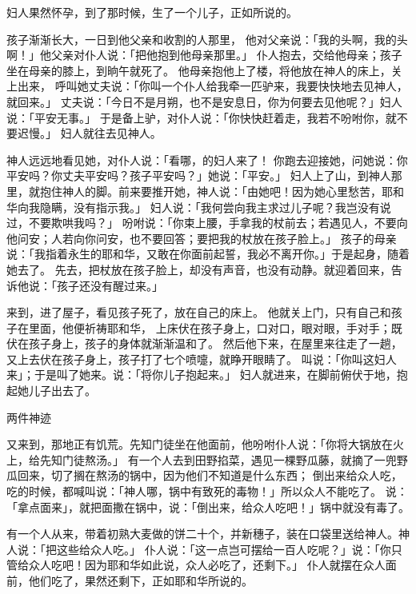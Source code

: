 {妇人果然怀孕，到了那时候，生了一个儿子，正如{}所说的。
\par }{\PP {}孩子渐渐长大，一日到他父亲和收割的人那里，
他对父亲说：「我的头啊，我的头啊！」他父亲对仆人说：「把他抱到他母亲那里。」
仆人抱去，交给他母亲；孩子坐在母亲的膝上，到晌午就死了。
他母亲抱他上了楼，将他放在神人的床上，关上{}出来，
呼叫她丈夫说：「你叫一个仆人给我牵一匹驴来，我要快快地去见神人，就回来。」
丈夫说：「今日不是月朔，也不是安息日，你为何要去见他呢？」妇人说：「平安无事。」
于是备上驴，对仆人说：「你快快赶着走，我若不吩咐你，就不要迟慢。」
妇人就往{}去见神人。
\par }{\PP 神人远远地看见她，对仆人{}说：「看哪，{}的妇人来了！
你跑去迎接她，问她说：你平安吗？你丈夫平安吗？孩子平安吗？」她说：「平安。」
妇人上了山，到神人那里，就抱住神人的脚。{}前来要推开她，神人说：「由她吧！因为她心里愁苦，耶和华向我隐瞒，没有指示我。」
妇人说：「我何尝向我主求过儿子呢？我岂没有说过，不要欺哄我吗？」
吩咐{}说：「你束上腰，手拿我的杖前去；若遇见人，不要向他问安；人若向你问安，也不要回答；要把我的杖放在孩子脸上。」
孩子的母亲说：「我指着永生的耶和华，又敢在你面前起誓，我必不离开你。」于是{}起身，随着她去了。
先去，把杖放在孩子脸上，却没有声音，也没有动静。{}就迎着{}回来，告诉他说：「孩子还没有醒过来。」
\par }{\PP {}来到，进了屋子，看见孩子死了，放在自己的床上。
他就关上门，只有自己和孩子在里面，他便祈祷耶和华，
上床伏在孩子身上，口对口，眼对眼，手对手；既伏在孩子身上，孩子的身体就渐渐温和了。
然后他下来，在屋里来往走了一趟，又上去伏在孩子身上，孩子打了七个喷嚏，就睁开眼睛了。
叫{}说：「你叫这{}妇人来」；于是叫了她来。{}说：「将你儿子抱起来。」
妇人就进来，在{}脚前俯伏于地，抱起她儿子出去了。
\par }{\SH 两件神迹
\par }{\PP {}又来到{}，那地正有饥荒。先知门徒坐在他面前，他吩咐仆人说：「你将大锅放在火上，给先知门徒熬汤。」
有一个人去到田野掐菜，遇见一棵野瓜藤，就摘了一兜野瓜回来，切了搁在熬汤的锅中，因为他们不知道是什么东西；
倒出来给众人吃，吃的时候，都喊叫说：「神人哪，锅中有致死的毒物！」所以众人不能吃了。
说：「拿点面来」，就把面撒在锅中，说：「倒出来，给众人吃吧！」锅中就没有毒了。
\par }{\PP {}有一个人从{}来，带着初熟大麦做的饼二十个，并新穗子，装在口袋里送给神人。神人说：「把这些给众人吃。」
仆人说：「这一点岂可摆给一百人吃呢？」{}说：「你只管给众人吃吧！因为耶和华如此说，众人必吃了，还剩下。」
仆人就摆在众人面前，他们吃了，果然还剩下，正如耶和华所说的。

}

